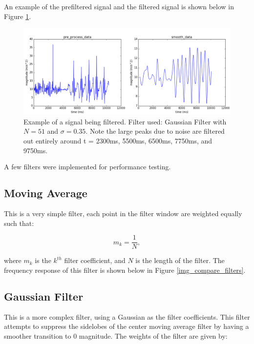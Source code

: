             An example of the prefiltered signal and the filtered signal is shown below in Figure \ref{img_filtered_signal}.

            \begin{figure}[h]
                \includegraphics[width=\textwidth]{Images/filtered_signal.png}
                \centering
                \caption{Example of a signal being filtered. Filter used: Gaussian Filter with $N=51$ and $\sigma=0.35$. Note the large peaks due to noise are filtered out entirely around t = 2300ms, 5500ms, 6500ms, 7750ms, and 9750ms.}
                \label{img_filtered_signal}
            \end{figure}

            A few filters were implemented for performance testing.

            \subsection{Moving Average}

                This is a very simple filter, each point in the filter window are weighted equally such that:

                \begin{equation}
                    m_k = \frac{1}{N},
                \end{equation}

                where $m_k$ is the $k^{th}$ filter coefficient, and $N$ is the length of the filter. The frequency response of this filter is shown below in Figure \ref{img_compare_filters}.

            \subsection{Gaussian Filter}

                This is a more complex filter, using a Gaussian as the filter coefficients. This filter attempts to suppress the sidelobes of the center moving average filter by having a smoother transition to 0 magnitude. The weights of the filter are given by:

